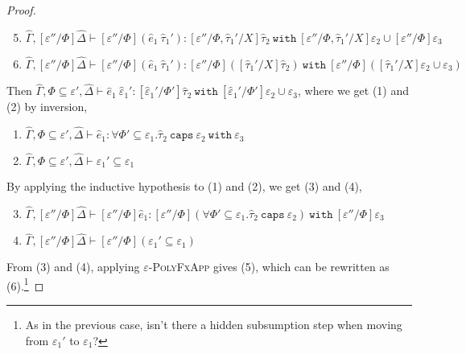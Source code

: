 \documentclass{llncs}
\newcommand{\keywadj}[1]{\mathtt{#1}}
\newcommand{\keyw}[1]{\keywadj{#1}~}
\newcommand{\kw}[1]{\keyw{ #1 }}
\begin{document}
\begin{proof}
\begin{enumerate}
	\setcounter{enumi}{4}
	\item $\hat \Gamma, [\varepsilon''/\Phi]\hat \Delta \vdash [\varepsilon''/\Phi](\hat e_1~ \hat \tau_1'): [\varepsilon''/\Phi, \hat \tau_1'/X]\hat \tau_2~\kw{with} [\varepsilon''/\Phi, \hat \tau_1'/X]\varepsilon_2 \cup [\varepsilon''/\Phi]\varepsilon_3$
	\item $\hat \Gamma, [\varepsilon''/\Phi]\hat \Delta \vdash [\varepsilon''/\Phi](\hat e_1~ \hat \tau_1'): [\varepsilon''/\Phi]([\hat \tau_1'/X]\hat \tau_2)~\kw{with} [\varepsilon''/\Phi]([\hat \tau_1'/X]\varepsilon_2 \cup \varepsilon_3)$
\end{enumerate}

 Then $\hat \Gamma, \Phi \subseteq \varepsilon', \hat \Delta \vdash \hat e_1~\hat \varepsilon_1': [\hat \varepsilon_1'/\Phi']\hat \tau_2~\kw{with} [\hat \varepsilon_1'/\Phi']\varepsilon_2 \cup \varepsilon_3$, where we get (1) and (2) by inversion,

\begin{enumerate}
	\item $\hat \Gamma, \Phi \subseteq \varepsilon', \hat \Delta \vdash \hat e_1: \forall \Phi' \subseteq \varepsilon_1. \hat \tau_2~\kw{caps} \varepsilon_2~\kw{with} \varepsilon_3$
	\item $\hat \Gamma, \Phi \subseteq \varepsilon', \hat \Delta \vdash \varepsilon_1' \subseteq \varepsilon_1$
\end{enumerate}

By applying the inductive hypothesis to (1) and (2), we get (3) and (4),

\begin{enumerate}
	\setcounter{enumi}{2}
	\item $\hat \Gamma, [\varepsilon''/\Phi]\hat \Delta \vdash [\varepsilon''/\Phi]\hat e_1: [\varepsilon''/\Phi](\forall \Phi' \subseteq \varepsilon_1. \hat \tau_2~\kw{caps} \varepsilon_2)~\kw{with} [\varepsilon''/\Phi]\varepsilon_3$
	\item $\hat \Gamma, [\varepsilon''/\Phi]\hat \Delta \vdash [\varepsilon''/\Phi](\varepsilon_1' \subseteq \varepsilon_1)$
\end{enumerate}

From (3) and (4), applying \textsc{$\varepsilon$-PolyFxApp} gives (5), which can be rewritten as (6).\footnote{As in the previous case, isn't there a hidden subsumption step when moving from $\varepsilon_1'$ to $\varepsilon_1$?}


\end{proof}
\end{document}
